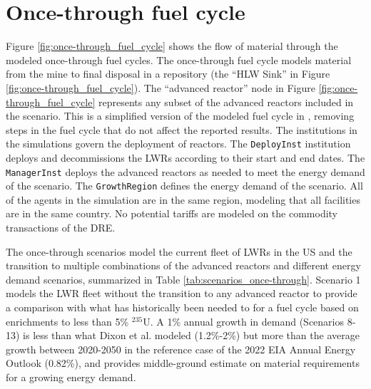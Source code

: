 \section{Once-through fuel cycle}
Figure \ref{fig:once-through_fuel_cycle} shows the flow of material through 
the modeled once-through fuel cycles. The once-through fuel cycle models 
material from the mine to final disposal in a repository (the 
``HLW Sink'' in Figure \ref{fig:once-through_fuel_cycle}). The ``advanced reactor'' 
node in Figure 
\ref{fig:once-through_fuel_cycle} represents any subset of the advanced reactors included 
in the scenario. This is a simplified version of the modeled fuel cycle in 
\cite{bachmann_enrichment_2021}, removing steps in the fuel cycle that 
do not affect the reported results. The institutions in the simulations 
govern the deployment of reactors. The \Cycamore \texttt{DeployInst} institution 
\cite{huff_fundamental_2016}
deploys and decommissions the \glspl{LWR} according to their start and end dates. 
The \Cycamore \texttt{ManagerInst} deploys the advanced reactors as needed to 
meet the energy demand of the scenario. The \Cycamore \texttt{GrowthRegion} 
defines the energy demand of the scenario. All of the 
agents in the simulation are in the same region, modeling that all facilities are
in the same country. No potential tariffs are modeled on the commodity 
transactions of the \gls{DRE}. 



The once-through scenarios model the current fleet of \glspl{LWR} in the 
US and the transition to multiple 
combinations of the advanced reactors and different energy demand scenarios, 
summarized in Table \ref{tab:scenarios_once-through}. Scenario 1 models
the \gls{LWR} fleet without the transition to any advanced reactor to provide 
a comparison with what has historically been needed to for a fuel cycle 
based on enrichments to less than 5\% $^{235}$U. A 1\% annual growth in 
demand (Scenarios 8-13) is less than what Dixon et al. \cite{dixon_estimated_2022} 
modeled
(1.2\%-2\%) but more than the average growth between 2020-2050 in the 
reference case of the 2022 \gls{EIA} Annual Energy Outlook 
\cite{energy_information_administration_annual_2022} (0.82\%), and 
provides middle-ground estimate on material requirements for a growing 
energy demand. 

